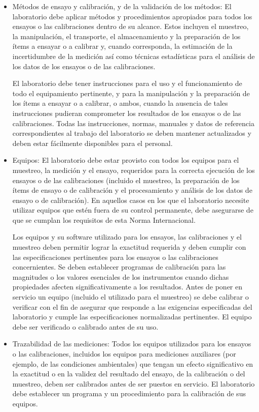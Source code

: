 \begin{itemize}
	\item Métodos de ensayo y calibración, y de la validación de los métodos: El laboratorio debe aplicar métodos y procedimientos apropiados para todos los ensayos o las calibraciones dentro de su alcance. Estos incluyen el muestreo, la manipulación, el transporte, el almacenamiento y la preparación de los ítems a ensayar o a calibrar y, cuando corresponda, la estimación de la incertidumbre de la medición así como técnicas estadísticas para el análisis de los datos de los ensayos o de las calibraciones.
	
	\par \noindent
	El laboratorio debe tener instrucciones para el uso y el funcionamiento de todo el equipamiento pertinente, y
	para la manipulación y la preparación de los ítems a ensayar o a calibrar, o ambos, cuando la ausencia de
	tales instrucciones pudieran comprometer los resultados de los ensayos o de las calibraciones. Todas las
	instrucciones, normas, manuales y datos de referencia correspondientes al trabajo del laboratorio se deben
	mantener actualizados y deben estar fácilmente disponibles para el personal. 
	
	\item Equipos: El laboratorio debe estar provisto con todos los equipos para el muestreo, la medición y el ensayo,
	requeridos para la correcta ejecución de los ensayos o de las calibraciones (incluido el muestreo, la
	preparación de los ítems de ensayo o de calibración y el procesamiento y análisis de los datos de ensayo o
	de calibración). En aquellos casos en los que el laboratorio necesite utilizar equipos que estén fuera de su
	control permanente, debe asegurarse de que se cumplan los requisitos de esta Norma Internacional.
	
	\par \noindent
	Los equipos y su software utilizado para los ensayos, las calibraciones y el muestreo deben permitir
	lograr la exactitud requerida y deben cumplir con las especificaciones pertinentes para los ensayos o las
	calibraciones concernientes. Se deben establecer programas de calibración para las magnitudes o los valores
	esenciales de los instrumentos cuando dichas propiedades afecten significativamente a los resultados. Antes
	de poner en servicio un equipo (incluido el utilizado para el muestreo) se debe calibrar o verificar con el fin de
	asegurar que responde a las exigencias especificadas del laboratorio y cumple las especificaciones
	normalizadas pertinentes. El equipo debe ser verificado o calibrado antes de su uso.
	
	\item Trazabilidad de las mediciones: Todos los equipos utilizados para los ensayos o las calibraciones, incluidos los equipos para mediciones
	auxiliares (por ejemplo, de las condiciones ambientales) que tengan un efecto significativo en la exactitud o
	en la validez del resultado del ensayo, de la calibración o del muestreo, deben ser calibrados antes de ser
	puestos en servicio. El laboratorio debe establecer un programa y un procedimiento para la calibración de sus
	equipos.
	
\end{itemize}

